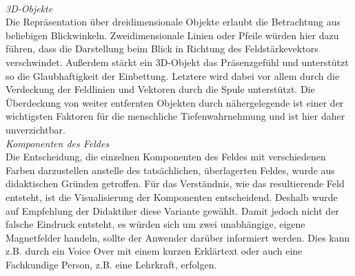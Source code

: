 \vspace{8px}
\begin{center}
	\\
\end{center}
\vspace{6px}

\textit{3D-Objekte}\\
Die Repräsentation über dreidimensionale Objekte erlaubt die Betrachtung aus beliebigen Blickwinkeln. Zweidimensionale Linien oder Pfeile würden hier dazu führen, dass die Darstellung beim Blick in Richtung des Feldstärkevektors verschwindet. Außerdem stärkt ein 3D-Objekt das Präsenzgefühl und unterstützt so die Glaubhaftigkeit der Einbettung. Letztere wird dabei vor allem durch die Verdeckung der Feldlinien und Vektoren durch die Spule unterstützt. Die Überdeckung von weiter entfernten Objekten durch nähergelegende ist einer der wichtigsten Faktoren für die menschliche Tiefenwahrnehmung und ist hier daher unverzichtbar.\\

\textit{Komponenten des Feldes}\\
Die Entscheidung, die einzelnen Komponenten des Feldes mit verschiedenen Farben darzustellen anstelle des tatsächlichen, überlagerten Feldes, wurde aus didaktischen Gründen getroffen. Für das Verständnis, wie das resultierende Feld entsteht, ist die Visualisierung der Komponenten entscheidend. Deshalb wurde auf Empfehlung der Didaktiker diese Variante gewählt. Damit jedoch nicht der falsche Eindruck entsteht, es würden sich um zwei unabhängige, eigene Magnetfelder handeln, sollte der Anwender darüber informiert werden. Dies kann z.B. durch ein Voice Over mit einem kurzen Erklärtext oder auch eine Fachkundige Person, z.B. eine Lehrkraft, erfolgen.\\

